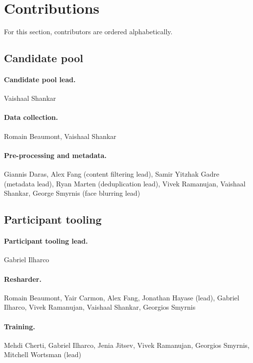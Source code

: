 \section{Contributions}
For this section, contributors are ordered alphabetically.

\subsection{Candidate pool}

\paragraph{Candidate pool lead.} Vaishaal Shankar

\paragraph{Data collection.} Romain Beaumont, Vaishaal Shankar

\paragraph{Pre-processing and metadata.} Giannis Daras, Alex Fang (content filtering lead), Samir Yitzhak Gadre (metadata lead), Ryan Marten (deduplication lead), Vivek Ramanujan, Vaishaal Shankar, George Smyrnis (face blurring lead)

\subsection{Participant tooling}

\paragraph{Participant tooling lead.} Gabriel Ilharco

\paragraph{Resharder.} Romain Beaumont, Yair Carmon, Alex Fang, Jonathan Hayase (lead), Gabriel Ilharco, Vivek Ramanujan, Vaishaal Shankar, Georgios Smyrnis

\paragraph{Training.} Mehdi Cherti, Gabriel Ilharco, Jenia Jitsev, Vivek Ramanujan, Georgios Smyrnis, Mitchell Wortsman (lead)

